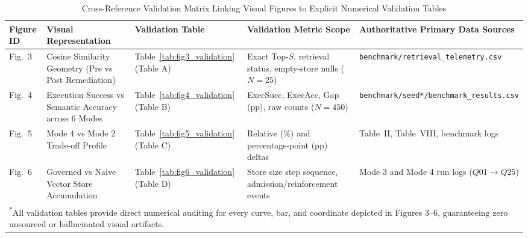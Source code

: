 \begin{table}[t]
\centering
\caption{Cross-Reference Validation Matrix Linking Visual Figures to Explicit Numerical Validation Tables}
\label{tab:figure_validation_matrix}
\begin{tabular}{lp{4.5cm}llp{4.8cm}}
\toprule
\textbf{Figure ID} & \textbf{Visual Representation} & \textbf{Validation Table} & \textbf{Validation Metric Scope} & \textbf{Authoritative Primary Data Sources} \\
\midrule
Fig.~3 & Cosine Similarity Geometry (Pre vs Post Remediation) & Table~\ref{tab:fig3_validation} (Table A) & Exact Top-$S$, retrieval status, empty-store nulls ($N=25$) & \texttt{benchmark/retrieval\_telemetry.csv} \\
Fig.~4 & Execution Success vs Semantic Accuracy across 6 Modes & Table~\ref{tab:fig4_validation} (Table B) & ExecSucc, ExecAcc, Gap (pp), raw counts ($N=450$) & \texttt{benchmark/seed*/benchmark\_results.csv} \\
Fig.~5 & Mode 4 vs Mode 2 Trade-off Profile & Table~\ref{tab:fig5_validation} (Table C) & Relative ($\%$) and percentage-point ($\text{pp}$) deltas & Table~II, Table~VIII, benchmark logs \\
Fig.~6 & Governed vs Naive Vector Store Accumulation & Table~\ref{tab:fig6_validation} (Table D) & Store size step sequence, admission/reinforcement events & Mode 3 and Mode 4 run logs ($Q01 \to Q25$) \\
\bottomrule
\multicolumn{5}{p{16.8cm}}{\footnotesize \textsuperscript{*}All validation tables provide direct numerical auditing for every curve, bar, and coordinate depicted in Figures 3--6, guaranteeing zero unsourced or hallucinated visual artifacts.} \\
\end{tabular}
\end{table}
